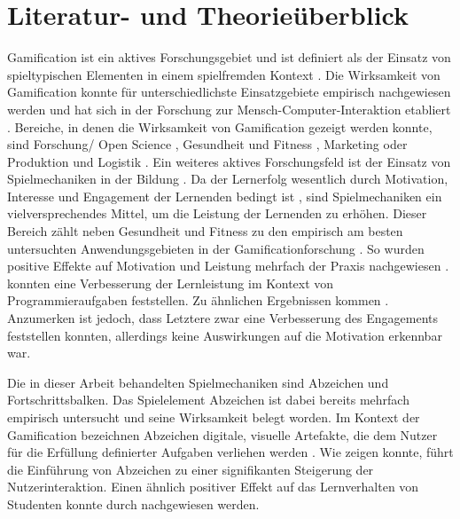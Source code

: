 \documentclass[
    a4paper,
    doc,
    12pt,
    natbib,
]{apa6}
\begin{document}
\section{Literatur- und Theorieüberblick}
Gamification ist ein aktives Forschungsgebiet und ist definiert als der Einsatz von spieltypischen Elementen in einem spielfremden Kontext \citep{deterding_game_2011}. 
Die Wirksamkeit von Gamification konnte für unterschiedlichste Einsatzgebiete empirisch nachgewiesen werden \citep{koivisto_rise_2019} und hat sich in der Forschung zur Mensch-Computer-Interaktion etabliert \citep{huotari_defining_2012}. 
Bereiche, in denen die Wirksamkeit von Gamification gezeigt werden konnte, sind Forschung/ Open Science \citep{brauer_erhohung_2019,kidwell_badges_2016}, Gesundheit und Fitness \citep{johnson_gamification_2016}, Marketing \citep{huotari_defining_2012} oder Produktion und Logistik \citep{warmelink_gamification_2018}.
Ein weiteres aktives Forschungsfeld ist der Einsatz von Spielmechaniken in der Bildung \citep{ibanez_gamification_2014,landers_enhancing_2017}. Da der Lernerfolg wesentlich durch Motivation, Interesse und Engagement der Lernenden bedingt ist \citep{astin_student_1984}, sind Spielmechaniken ein vielversprechendes Mittel, um die Leistung der Lernenden zu erhöhen.
Dieser Bereich zählt neben Gesundheit und Fitness zu den empirisch am besten untersuchten Anwendungsgebieten in der Gamificationforschung \citep{koivisto_rise_2019}.
So wurden positive Effekte auf Motivation und Leistung mehrfach der Praxis nachgewiesen \citep{ibanez_gamification_2014,hamzah_influence_2015,strmecki_gamification_2015}. \cite{layth_khaleel_empirical_2019} konnten eine Verbesserung der Lernleistung im Kontext von Programmieraufgaben feststellen. Zu ähnlichen Ergebnissen kommen \cite{ortiz_gamification_2017}. Anzumerken ist jedoch, dass Letztere zwar eine Verbesserung des Engagements feststellen konnten, allerdings keine Auswirkungen auf die Motivation erkennbar war.

Die in dieser Arbeit behandelten Spielmechaniken sind Abzeichen und Fortschrittsbalken.
Das Spielelement Abzeichen ist dabei bereits mehrfach empirisch untersucht und seine Wirksamkeit belegt worden. Im Kontext der Gamification bezeichnen Abzeichen digitale, visuelle Artefakte, die dem Nutzer für die Erfüllung definierter Aufgaben verliehen werden \citep{antin_badges_2011}. Wie \cite{hamari_badges_2017} zeigen konnte, führt die Einführung von Abzeichen zu einer signifikanten Steigerung der Nutzerinteraktion.
Einen ähnlich positiver Effekt auf das Lernverhalten von Studenten konnte durch \cite{hamzah_influence_2015} nachgewiesen werden.
\end{document}
